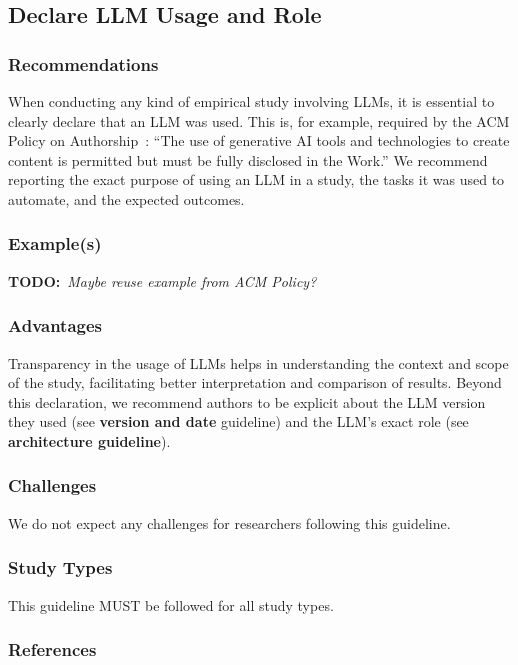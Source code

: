 \documentclass[11pt]{article}
\newcommand{\todo}[1]{{\textbf{TODO:}\ \textit{#1}}} %
\begin{document}
\subsection{Declare LLM Usage and Role}

\subsubsection{Recommendations}

When conducting any kind of empirical study involving LLMs, it is essential to clearly declare that an LLM was used.
This is, for example, required by the ACM Policy on Authorship~\cite{ACM2023}: ``The use of generative AI tools and technologies to create content is permitted but must be fully disclosed in the Work.''
We recommend reporting the exact purpose of using an LLM in a study, the tasks it was used to automate, and the expected outcomes.


\subsubsection{Example(s)}

\todo{Maybe reuse example from ACM Policy?}


\subsubsection{Advantages}

Transparency in the usage of LLMs helps in understanding the context and scope of the study, facilitating better interpretation and comparison of results.
Beyond this declaration, we recommend authors to be explicit about the LLM version they used (see \textbf{version and date} guideline) and the LLM's exact role (see \textbf{architecture guideline}).


\subsubsection{Challenges}

We do not expect any challenges for researchers following this guideline.


\subsubsection{Study Types}

This guideline MUST be followed for all study types.


\subsubsection{References}



\end{document}
